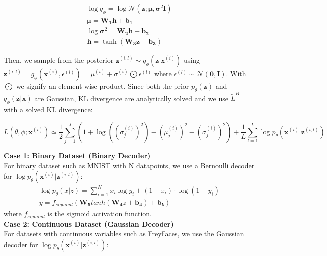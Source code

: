 \documentclass[11pt]{article}
\begin{document}
\begin{eqnarray}
\log q_\phi=\log\mathcal{N}(\mathbf{z}; \mathbf{\mu}, \mathbf{\sigma}^2\mathbf{I})\\
\mathbf{\mu}=\mathbf{W_1h}+\mathbf{b_1}\\
\log\mathbf{\sigma}^2=\mathbf{W_2h}+\mathbf{b_2}\\
\mathbf{h}=\tanh(\mathbf{W_3z}+\mathbf{b_3})
\end{eqnarray}



Then, we sample from the posterior $\mathbf{z}^{(i,l)}\sim q_\phi(\mathbf{z}|\mathbf{x}^{(i)})$ using $\mathbf{z}^{(i,l)}=g_\phi(\mathbf{x}^{(i)},\epsilon^{(l)})=\mu^{(i)}+\sigma^{(i)}\bigodot\epsilon^{(l)}$ where $\epsilon^{(l)}\sim\mathcal{N}(\mathbf{0},\mathbf{I})$. With $\bigodot$ we signify an element-wise product. Since both the prior $p_\theta(\mathbf{z})$ and $q_\phi(\mathbf{z}|\mathbf{x})$ are Gaussian, KL divergence are analytically solved and we use $\widetilde{L}^B$ with a solved KL divergence:

\begin{equation}
L(\theta, \phi; \mathbf{x}^{(i)})\simeq\frac{1}{2}\sum_{j=1}^J(1+\log((\sigma_j^{(i)})^2)-(\mu_j^{(i)})^2-(\sigma_j^{(i)})^2)+\frac{1}{L}\sum_{l=1}^{L}\log p_\theta(\mathbf{x}^{(i)}|\mathbf{z}^{(i,l)})
\end{equation}

\textbf{Case 1: Binary Dataset (Binary Decoder)}\\
For binary dataset such as MNIST with N datapoints, we use a Bernoulli decoder for $\log p_\theta(\mathbf{x}^{(i)}|\mathbf{z}^{(i,l)})$:
\begin{eqnarray}
\log p_{\theta}(x|z) =\sum_{i=1}^N x_i \log y_i + (1-x_i)\cdot\log (1-y_i)\\
y=f_{sigmoid}(\mathbf{W_5}tanh(\mathbf{W_4}z+\mathbf{b_4})+\mathbf{b_5})
\end{eqnarray}
where $f_{sigmoid}$ is the sigmoid activation function.\\

\textbf{Case 2: Continuous Dataset (Gaussian Decoder)}\\
For datasets with continuous variables such as FreyFaces, we use the Gaussian decoder for $\log p_\theta(\mathbf{x}^{(i)}|\mathbf{z}^{(i,l)})$:
\end{document}

